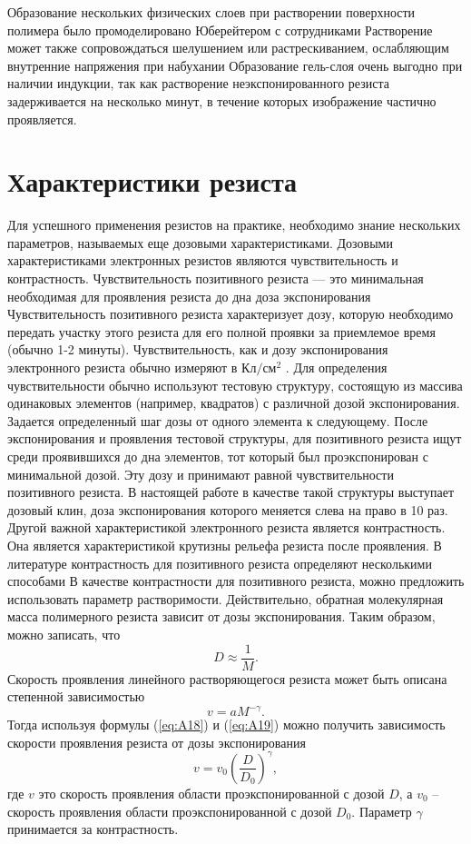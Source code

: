 Образование нескольких физических
слоев при растворении поверхности полимера было промоделировано Юберейтером с сотрудниками Растворение может также сопровождаться шелушением или растрескиванием, ослабляющим внутренние напряжения при набухании Образование гель-слоя очень выгодно при наличии индукции, так как растворение неэкспонированного резиста задерживается на несколько минут, в течение которых изображение частично проявляется.

\section{Характеристики резиста}

Для успешного применения резистов на практике, необходимо знание нескольких параметров, называемых еще дозовыми характеристиками. Дозовыми характеристиками электронных резистов являются чувствительность и контрастность. Чувствительность позитивного резиста — это минимальная необходимая для проявления резиста до дна доза экспонирования Чувствительность позитивного резиста характеризует дозу, которую необходимо передать участку этого резиста для его полной проявки за приемлемое время (обычно 1-2 минуты). Чувствительность, как и дозу экспонирования электронного резиста обычно измеряют в $\text{Кл}/\text{см}^2$ . Для
определения чувствительности обычно используют тестовую структуру, состоящую из массива одинаковых элементов (например, квадратов) с
различной дозой экспонирования. Задается определенный шаг дозы от одного элемента к следующему. После экспонирования и проявления тестовой структуры, для позитивного резиста ищут среди проявившихся до дна элементов, тот который был проэкспонирован с минимальной дозой. Эту дозу и принимают равной чувствительности позитивного резиста. В настоящей работе в качестве такой структуры выступает дозовый клин, доза экспонирования которого меняется слева на право в 10 раз.
Другой важной характеристикой электронного резиста является контрастность. Она является характеристикой крутизны рельефа резиста после проявления. В литературе контрастность для позитивного резиста определяют несколькими способами	В качестве контрастности для
позитивного резиста, можно предложить использовать параметр растворимости. Действительно, обратная молекулярная масса полимерного резиста зависит от дозы экспонирования. 
Таким образом, можно записать, что
\begin{equation}
D\approx \frac{1}{M}.
\label{eq:A18}
\end{equation}
Скорость проявления линейного растворяющегося резиста может быть описана степенной зависимостью \cite{16,22,23}
\begin{equation}
v=aM^{-\gamma}.
\label{eq:A19}
\end{equation}
Тогда используя формулы (\ref{eq:A18}) и (\ref{eq:A19}) можно получить зависимость скорости проявления резиста от дозы экспонирования 
\begin{equation}
v=v_0\left(\frac{D}{D_0}\right)^\gamma,
\label{eq:A20}
\end{equation}
где $v$ это скорость проявления области проэкспонированной с дозой $D$, а $v_0$ -- скорость проявления области проэкспонированной с дозой $D_0$. Параметр $\gamma$ принимается за контрастность. 
